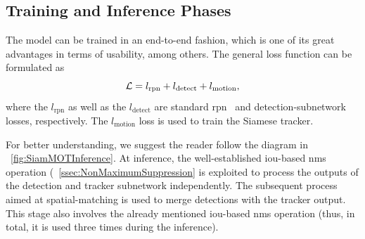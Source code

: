 \subsection{Training and Inference Phases}

The \siammot{} model can be trained in an end-to-end fashion, which is one of its great advantages in terms of usability, among others. The general loss function can be formulated as
\begin{equation}
    \label{eq:SiamMOTGeneralLoss}
    \mathcal{L} = l_{\text{rpn}} + l_{\text{detect}} + l_{\text{motion}},
\end{equation}
where the $l_{\text{rpn}}$ as well as the $l_{\text{detect}}$ are standard \gls{rpn}~\cite{ren2017fasterrcnn} and detection-subnetwork~\cite{girshick2015fast} losses, respectively. The $l_{\text{motion}}$ loss is used to train the Siamese tracker.

For better understanding, we suggest the reader follow the diagram in \figstr{}~\ref{fig:SiamMOTInference}. At inference, the well-established \gls{iou}-based \gls{nms} operation (\sectionstr{}~\ref{ssec:NonMaximumSuppression} is exploited to process the outputs of the detection and tracker subnetwork independently. The subsequent process aimed at spatial-matching is used to merge detections with the tracker output. This stage also involves the already mentioned \gls{iou}-based \gls{nms} operation (thus, in total, it is used three times during the inference).


